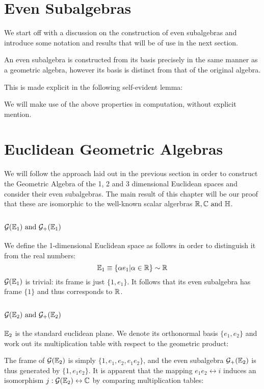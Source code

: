 \section{Even Subalgebras}
We start off with a discussion on the construction of even subalgebras and introduce some notation and results that will be of use in the next section.

An even subalgebra is constructed from its basis precisely in the same manner as a geometric algebra, however its basis is distinct from that of the original algebra.

This is made explicit in the following self-evident lemma:

We will make use of the above properties in computation, without explicit mention.


\newpage

\section{Euclidean Geometric Algebras}
We will follow the approach laid out in the previous section in order to construct the Geometric Algebra of the 1, 2 and 3 dimensional Euclidean spaces and consider their even subalgebras.
The main result of this chapter will be our proof that these are isomorphic to the well-known scalar algerbras $\R, \C \mathrm{\ and\ } \HM$.

\subsection{$\G(\E_1)\ \mathrm{and}\ \G_+(\E_1)$}

We define the 1-dimensional Euclidean space as follows in order to distinguish it from the real numbers:
\[\mathbb{E}_1 \equiv \{\alpha e_1 | \alpha \in \mathbb{R}\} \sim \mathbb{R}\]
$\mathcal{G}(\mathbb{E}_1)$  is trivial: its frame is just $\{1, e_1\}$.
It follows that its even subalgebra has frame $\{1\}$ and thus corresponds to $\mathbb{R}$.

\subsection{$\G(\E_2)\ \mathrm{and}\ \G_+(\E_2)$}

$\mathbb{E}_2$ is the standard euclidean plane. We denote its orthonormal basis $\{e_1, e_2\}$ and work out its multiplication table with respect to the geometric product:


The frame of $\mathcal{G}(\mathbb{E}_2)$ is simply $\{1, e_1, e_2, e_1e_2\}$, and the even subalgebra $\mathcal{G}_+(\mathbb{E}_2)$ is thus generated by $\{1, e_1e_2 \}$.
It is apparent that the mapping $e_1e_2 \leftrightarrow i$ induces an isomorphism $j : \mathcal{G}(\mathbb{E}_2) \leftrightarrow \mathbb{C}$ by comparing multiplication tables:


